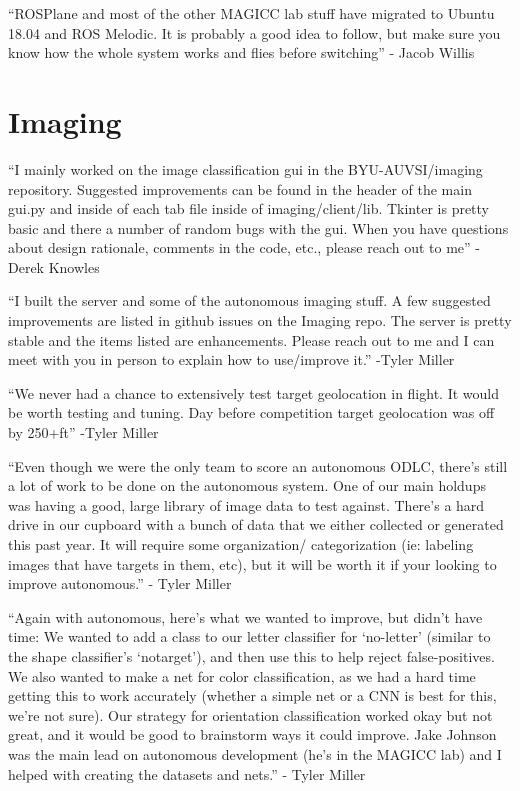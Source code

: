 {}

{``ROSPlane and most of the other MAGICC lab stuff have migrated to
Ubuntu 18.04 and ROS Melodic. It is probably a good idea to follow, but
make sure you know how the whole system works and flies before
switching'' - Jacob Willis}

\hypertarget{h.nive7frldvsy}{\section{\texorpdfstring{{Imaging}}{Imaging}}\label{h.nive7frldvsy}}

{}

{``I mainly worked on the image classification gui in the
BYU-AUVSI/imaging repository. Suggested improvements can be found in the
header of the main gui.py and inside of each tab file inside of
imaging/client/lib. Tkinter is pretty basic and there a number of random
bugs with the gui. When you have questions about design rationale,
comments in the code, etc., please reach out to me'' - Derek Knowles}

{}

{``I built the server and some of the autonomous imaging stuff. A few
suggested improvements are listed in github issues on the Imaging repo.
The server is pretty stable and the items listed are enhancements.
Please reach out to me and I can meet with you in person to explain how
to use/improve it.'' -Tyler Miller}

{}

{``We never had a chance to extensively test target geolocation in
flight. It would be worth testing and tuning. Day before competition
target geolocation was off by 250+ft'' -Tyler Miller}

{}

{``Even though we were the only team to score an autonomous ODLC,
there's still a lot of work to be done on the autonomous system. One of
our main holdups was having a good, large library of image data to test
against. There's a hard drive in our cupboard with a bunch of data that
we either collected or generated this past year. It will require some
organization/ categorization (ie: labeling images that have targets in
them, etc), but it will be worth it if your looking to improve
autonomous.'' - Tyler Miller}

{}

{``Again with autonomous, here's what we wanted to improve, but didn't
have time: We wanted to add a class to our letter classifier for
`no-letter' (similar to the shape classifier's `notarget'), and then use
this to help reject false-positives. We also wanted to make a net for
color classification, as we had a hard time getting this to work
accurately (whether a simple net or a CNN is best for this, we're not
sure). Our strategy for orientation classification worked okay but not
great, and it would be good to brainstorm ways it could improve. Jake
Johnson was the main lead on autonomous development (he's in the MAGICC
lab) and I helped with creating the datasets and nets.'' - Tyler Miller}

